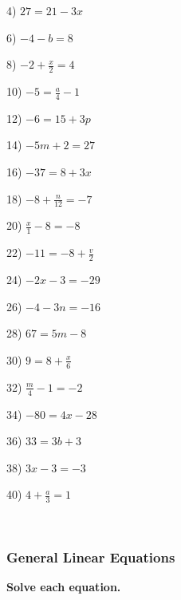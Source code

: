 \documentclass[11pt]{book}
\newcommand{\tmstrong}[1]{\textbf{#1}}
\theoremstyle{definition}  %
\begin{document}
\begin{multicols}{2}
  4) $27 = 21 - 3 x$
  
  6) $- 4 - b = 8$
  
  8) $- 2 + \frac{x}{2} = 4$
  
  10) $- 5 = \frac{a}{4} - 1$
  
  12) $- 6 = 15 + 3 p$
  
  14) $- 5 m + 2 = 27$
  
  16) $- 37 = 8 + 3 x$
  
  18) $- 8 + \frac{n}{12} = - 7$
  
  20) $\frac{x}{1} - 8 = - 8$
  
  22) $- 11 = - 8 + \frac{v}{2}$
  
  24) $- 2 x - 3 = - 29$
  
  26) $- 4 - 3 n = - 16$
  
  28) $67 = 5 m - 8$
  
  30) $9 = 8 + \frac{x}{6}$
  
  32) $\frac{m}{4} - 1 = - 2$
  
  34) $- 80 = 4 x - 28$
  
  36) $33 = 3 b + 3$
  
  38) $3 x - 3 = - 3$
  
  40) $4 + \frac{a}{3} = 1$
\end{multicols}

\vspace{2in}
~

\pagebreak

\subsubsection{General Linear Equations}\par

{\tmstrong{Solve each equation.}}
\end{document}

